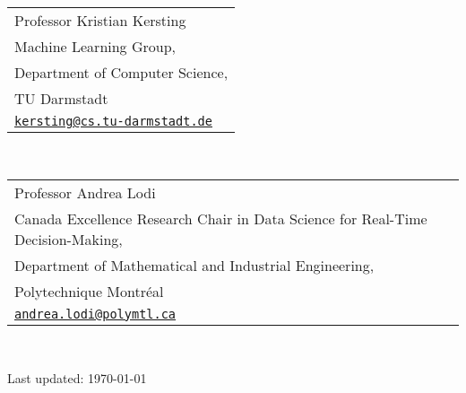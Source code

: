 \documentclass[11pt, a4paper, DIV=12]{scrartcl}
\begin{document}
\begin{tabular}{l}
	Professor Kristian Kersting\\ 
	Machine Learning Group,\\
	Department of Computer Science,\\
	TU Darmstadt\\
	\href{mailto:kersting@cs.tu-darmstadt.de}{\texttt{kersting@cs.tu-darmstadt.de}}\\
\end{tabular}\\[0.5em]

\begin{tabular}{l}
	Professor Andrea Lodi\\
	Canada Excellence Research Chair in Data Science for Real-Time Decision-Making,\\ 
	Department of Mathematical and Industrial Engineering,\\
	Polytechnique Montréal \\
	\href{mailto:andrea.lodi@polymtl.ca}{\texttt{andrea.lodi@polymtl.ca}}\\
\end{tabular}\\[0.5em]



\vfill{} 
\begin{center}
{\scriptsize Last updated: \today}
\end{center}
\end{document}
